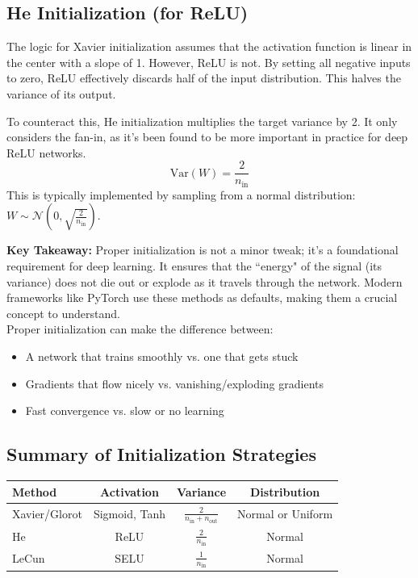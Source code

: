 \documentclass{article}
\begin{document}
\subsection{He Initialization (for ReLU)}

The logic for Xavier initialization assumes that the activation function is linear in the center with a slope of 1. However, ReLU is not. By setting all negative inputs to zero, ReLU effectively discards half of the input distribution. This halves the variance of its output.

To counteract this, He initialization multiplies the target variance by 2. It only considers the fan-in, as it's been found to be more important in practice for deep ReLU networks.
\begin{equation}
    \text{Var}(W) = \frac{2}{n_{\text{in}}}
\end{equation}
This is typically implemented by sampling from a normal distribution: $W \sim \mathcal{N}\left(0, \sqrt{\frac{2}{n_{\text{in}}}}\right)$.



\begin{tcolorbox}
\textbf{Key Takeaway:} Proper initialization is not a minor tweak; it's a foundational requirement for deep learning. It ensures that the ``energy" of the signal (its variance) does not die out or explode as it travels through the network. Modern frameworks like PyTorch use these methods as defaults, making them a crucial concept to understand.\\

Proper initialization can make the difference between:
\begin{itemize}
    \item A network that trains smoothly vs. one that gets stuck
    \item Gradients that flow nicely vs. vanishing/exploding gradients
    \item Fast convergence vs. slow or no learning
\end{itemize}
\end{tcolorbox}




\subsection{Summary of Initialization Strategies}

\begin{center}
\begin{tabular}{|l|c|c|c|}
\hline
\textbf{Method} & \textbf{Activation} & \textbf{Variance} & \textbf{Distribution} \\
\hline
Xavier/Glorot & Sigmoid, Tanh & $\frac{2}{n_{\text{in}} + n_{\text{out}}}$ & Normal or Uniform \\
\hline
He & ReLU & $\frac{2}{n_{\text{in}}}$ & Normal \\
\hline
LeCun & SELU & $\frac{1}{n_{\text{in}}}$ & Normal \\
\hline
\end{tabular}
\end{center}
\end{document}
